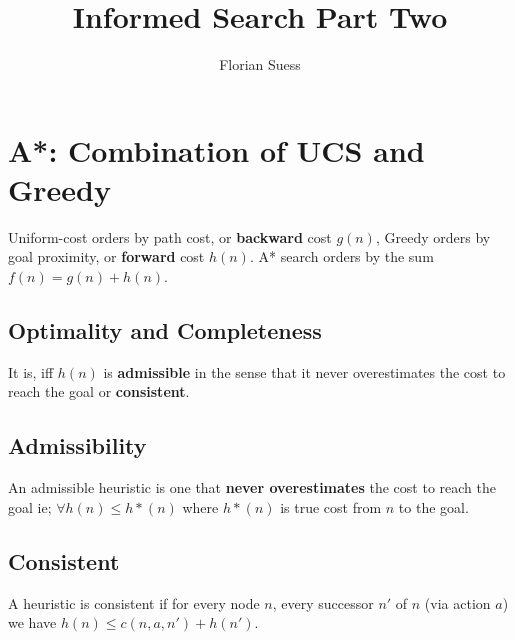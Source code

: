 \documentclass{article}
\begin{document}
\title{Informed Search Part Two}
\date{}
\author{Florian Suess}
\maketitle

\section{A*: Combination of UCS and Greedy}
Uniform-cost orders by path cost, or \textbf{backward} cost $g(n)$, Greedy orders by goal proximity, or \textbf{forward} cost $h(n)$. A* search orders by the sum $f(n) = g(n) + h(n)$.

\subsection{Optimality and Completeness}
It is, iff $h(n)$ is \textbf{admissible} in the sense that it never overestimates the cost to reach the goal or \textbf{consistent}.

\subsection{Admissibility}
An admissible heuristic is one that \textbf{never overestimates} the cost to reach the goal ie; $\forall h(n) \leq h * (n)$ where $h * (n)$ is true cost from $n$ to the goal.

\subsection{Consistent}
A heuristic is consistent if for every node $n$, every successor $n'$ of $n$ (via action $a$) we have $h(n) \leq c(n,a,n') + h(n')$.
\end{document}
